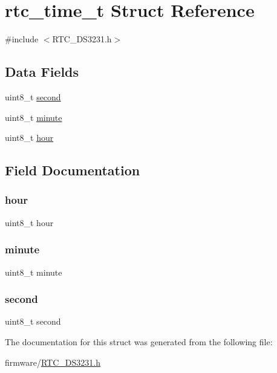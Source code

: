 \hypertarget{structrtc__time__t}{}\section{rtc\+\_\+time\+\_\+t Struct Reference}
\label{structrtc__time__t}


{\ttfamily \#include $<$R\+T\+C\+\_\+\+D\+S3231.\+h$>$}

\subsection*{Data Fields}
\begin{DoxyCompactItemize}
\item 
uint8\+\_\+t \hyperlink{structrtc__time__t_a8459fc4e94de7eefc74991e41779c8fc}{second}
\item 
uint8\+\_\+t \hyperlink{structrtc__time__t_a8ff981ec55c945940f4a0da7d8709b3c}{minute}
\item 
uint8\+\_\+t \hyperlink{structrtc__time__t_ae5af4ff48939d13d480f87e56a9385d6}{hour}
\end{DoxyCompactItemize}


\subsection{Field Documentation}
\hypertarget{structrtc__time__t_ae5af4ff48939d13d480f87e56a9385d6}{}\label{structrtc__time__t_ae5af4ff48939d13d480f87e56a9385d6} 
\subsubsection{\texorpdfstring{hour}{hour}}
{\footnotesize\ttfamily uint8\+\_\+t hour}

\hypertarget{structrtc__time__t_a8ff981ec55c945940f4a0da7d8709b3c}{}\label{structrtc__time__t_a8ff981ec55c945940f4a0da7d8709b3c} 
\subsubsection{\texorpdfstring{minute}{minute}}
{\footnotesize\ttfamily uint8\+\_\+t minute}

\hypertarget{structrtc__time__t_a8459fc4e94de7eefc74991e41779c8fc}{}\label{structrtc__time__t_a8459fc4e94de7eefc74991e41779c8fc} 
\subsubsection{\texorpdfstring{second}{second}}
{\footnotesize\ttfamily uint8\+\_\+t second}



The documentation for this struct was generated from the following file\+:\begin{DoxyCompactItemize}
\item 
firmware/\hyperlink{_r_t_c___d_s3231_8h}{R\+T\+C\+\_\+\+D\+S3231.\+h}\end{DoxyCompactItemize}
